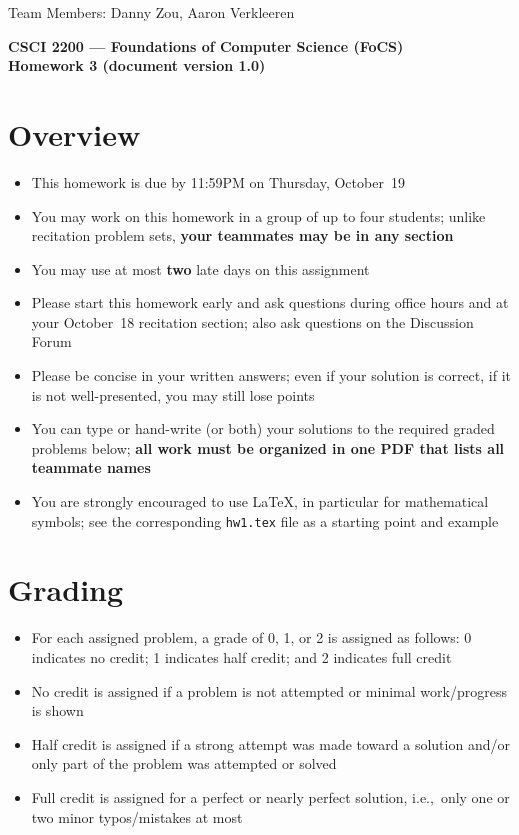 \documentclass[11pt]{article}
\begin{document}
\thispagestyle{empty}

Team Members: Danny Zou, Aaron Verkleeren

\begin{center}
\large
\textbf{CSCI 2200 --- Foundations of Computer Science (FoCS) \\
Homework 3 (document version 1.0)}
\end{center}

\section*{Overview}
\begin{itemize}
\item This homework is due by 11:59PM on Thursday, October~19
\item You may work on this homework in a group of up to four students;
  unlike recitation problem sets,
  \textbf{your teammates may be in any section}
\item You may use at most \textbf{two} late days on this assignment
\item Please start this homework early and ask questions during
  office hours and at your October~18 recitation section;
  also ask questions on the Discussion Forum
\item Please be concise in your written answers;
  even if your solution is correct, if it is not well-presented,
  you may still lose points
\item You can type or hand-write (or both) your solutions
  to the required graded problems below;
  \textbf{all work must be organized in one PDF that lists
  all teammate names}
\item You are strongly encouraged to use LaTeX, in particular for
  mathematical symbols;
  see the corresponding \verb+hw1.tex+ file as a starting point
  and example
\end{itemize}


\section*{Grading}
\begin{itemize}
\item For each assigned problem, a grade of 0, 1, or 2 is assigned
  as follows:
  0 indicates no credit;
  1 indicates half credit;
  and 2 indicates full credit
\item No credit is assigned if a problem is not attempted
  or minimal work/progress is shown
\item Half credit is assigned if a strong attempt was made
  toward a solution and/or only part of the problem was attempted or solved
\item Full credit is assigned for a perfect or nearly perfect solution,
  i.e.,~only one or two minor typos/mistakes at most
\end{itemize}
\end{document}
